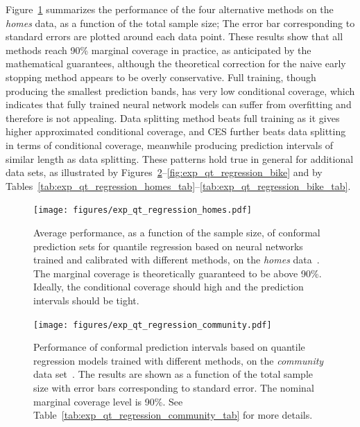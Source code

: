 Figure~\ref{fig:exp_qt_regression_homes} summarizes the performance of the four alternative methods on the {\em homes} data, as a function of the total sample size; The error bar corresponding to standard errors are plotted around each data point. These results show that all methods reach 90\% marginal coverage in practice, as anticipated by the mathematical guarantees, although the theoretical correction for the naive early stopping method appears to be overly conservative. Full training, though producing the smallest prediction bands, has very low conditional coverage, which indicates that fully trained neural network models can suffer from overfitting and therefore is not appealing. Data splitting method beats full training as it gives higher approximated conditional coverage, and CES further beats data splitting in terms of conditional coverage, meanwhile producing prediction intervals of similar length as data splitting. These patterns hold true in general for additional data sets, as illustrated by Figures~\ref{fig:exp_qt_regression_community}--\ref{fig:exp_qt_regression_bike} and by Tables~\ref{tab:exp_qt_regression_homes_tab}--\ref{tab:exp_qt_regression_bike_tab}.


\begin{figure}[!htb]
    \centering
    \texttt{[image: figures/exp\_qt\_regression\_homes.pdf]}\vspace{-0.5cm}
    \caption{Average performance, as a function of the sample size, of conformal prediction sets for quantile regression based on neural networks trained and calibrated with different methods, on the {\em homes} data~\cite{homes}. The marginal coverage is theoretically guaranteed to be above 90\%. Ideally, the conditional coverage should high and the prediction intervals should be tight.}
    \label{fig:exp_qt_regression_homes}
\end{figure}


\begin{figure}[!htb]
    \centering
    \texttt{[image: figures/exp\_qt\_regression\_community.pdf]}
    \caption{Performance of conformal prediction intervals based on quantile regression models trained with different methods, on the {\em community} data set~\cite{community}. The results are shown as a function of the total sample size with error bars corresponding to standard error. The nominal marginal coverage level is 90\%. See Table~\ref{tab:exp_qt_regression_community_tab} for more details.}
    \label{fig:exp_qt_regression_community}
\end{figure}

